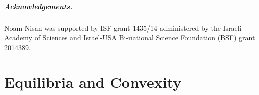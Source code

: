 \documentclass[11pt,a4paper]{article}
\newcommand{\qed}{\rule{1.5mm}{2mm}\vspace{0.1in}}
\newenvironment{proof}{\par\noindent{\bf Proof:}}{\qed}
\newtheorem{theorem}{Theorem}[section]
\newtheorem{fact}[theorem]{Fact}
\begin{document}
%
%





\subparagraph*{Acknowledgements.}

Noam Nisan was supported by ISF grant 1435/14 administered by the Israeli Academy of Sciences and Israel-USA Bi-national Science Foundation (BSF) grant  2014389.



%





%


\appendix

\section{Equilibria and Convexity}
\label{app:eq-are-convex}
\end{document}
